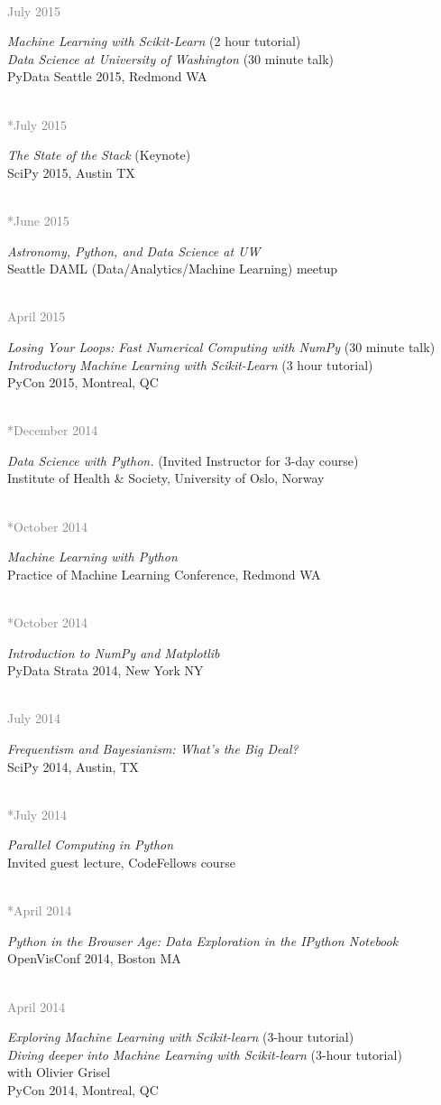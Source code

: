 \documentclass{article} %
\newlength\sidebarwidth
\newcommand{\dateonly}[2][]
	 {\begin{minipage}{\textwidth}
	 \vspace*{.4\baselineskip}
         \nopagebreak\hspace{0in}%
         \nopagebreak\begin{minipage}[t]{\sidebarwidth - .2cm}
         \raggedleft {~}
         {\\[-\baselineskip] \textcolor{gray}{\footnotesize #1}}
	 \end{minipage}%
	 \hfill
	 \begin{minipage}[t]{\linewidth - \sidebarwidth}
	 #2%
	 \end{minipage}%
	 \vspace*{.2\baselineskip plus 1\baselineskip minus
	 .2\baselineskip}%
	 \end{minipage}}
\begin{document}
  \dateonly[July 2015]{
    {\it Machine Learning with Scikit-Learn} (2 hour tutorial)\\
    {\it Data Science at University of Washington} (30 minute talk)\\
    PyData Seattle 2015, Redmond WA
  }

  \dateonly[**July 2015]{
    {\it The State of the Stack} (Keynote)\\
    SciPy 2015, Austin TX
  }

  \dateonly[**June 2015]{
    {\it Astronomy, Python, and Data Science at UW}\\
    Seattle DAML (Data/Analytics/Machine Learning) meetup
  }

  \dateonly[April 2015]{
    {\it Losing Your Loops: Fast Numerical Computing with NumPy} (30 minute talk)\\
    {\it Introductory Machine Learning with Scikit-Learn} (3 hour tutorial)\\
    PyCon 2015, Montreal, QC
  }

  \dateonly[**December 2014]{
    {\it Data Science with Python.} (Invited Instructor for 3-day course)\\
    Institute of Health \& Society, University of Oslo, Norway
  }

  \dateonly[**October 2014]{
    {\it Machine Learning with Python}\\
    Practice of Machine Learning Conference, Redmond WA
  }

  \dateonly[**October 2014]{
    {\it Introduction to NumPy and Matplotlib}\\
    PyData \@ Strata 2014, New York NY
  }

  \dateonly[July 2014]{
    {\it Frequentism and Bayesianism: What's the Big Deal?}\\
    SciPy 2014, Austin, TX
  }

  \dateonly[**July 2014]{
    {\it Parallel Computing in Python}\\
    Invited guest lecture, CodeFellows course
  }

  \dateonly[**April 2014]{
    {\it Python in the Browser Age: Data Exploration in the IPython Notebook}\\
    OpenVisConf 2014, Boston MA
  }

  \dateonly[April 2014]{
    {\it Exploring Machine Learning with Scikit-learn} (3-hour tutorial)\\
    {\it Diving deeper into Machine Learning with Scikit-learn} (3-hour tutorial)\\
    with Olivier Grisel\\
    PyCon 2014, Montreal, QC
  }
\end{document}
